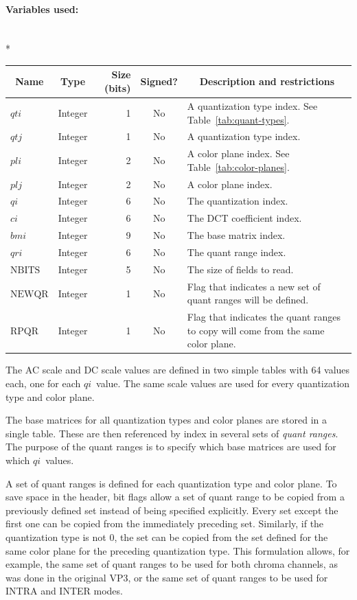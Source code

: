\documentclass[11pt,letterpaper]{book}
\newcommand{\idx}[1]{{\ensuremath{\mathit{#1}}}}
\newcommand{\qti}{\idx{qti}}
\newcommand{\qtj}{\idx{qtj}}
\newcommand{\pli}{\idx{pli}}
\newcommand{\plj}{\idx{plj}}
\newcommand{\qi}{\idx{qi}}
\newcommand{\ci}{\idx{ci}}
\newcommand{\bmi}{\idx{bmi}}
\newcommand{\qri}{\idx{qri}}
\newcommand{\locvar}[1]{\ensuremath{\mathrm{#1}}}
\newcommand{\term}[1]{{\em #1}}
\numberwithin{equation}{chapter}
\numberwithin{figure}{chapter}
\numberwithin{table}{chapter}
\begin{document}
\paragraph{Variables used:}\hfill\\*
\begin{tabularx}{\textwidth}{@{}llrcX@{}}\toprule
\multicolumn{1}{c}{Name} &
\multicolumn{1}{c}{Type} &
\multicolumn{1}{p{30pt}}{\centering Size (bits)} &
\multicolumn{1}{c}{Signed?} &
\multicolumn{1}{c}{Description and restrictions} \\\midrule\endhead
\locvar{\qti}    & Integer &  1 & No & A quantization type index.
See Table~\ref{tab:quant-types}.\\
\locvar{\qtj}    & Integer &  1 & No & A quantization type index. \\
\locvar{\pli}    & Integer &  2 & No & A color plane index.
See Table~\ref{tab:color-planes}.\\
\locvar{\plj}    & Integer &  2 & No & A color plane index. \\
\locvar{\qi}     & Integer &  6 & No & The quantization index. \\
\locvar{\ci}     & Integer &  6 & No & The DCT coefficient index. \\
\locvar{\bmi}    & Integer &  9 & No & The base matrix index. \\
\locvar{\qri}    & Integer &  6 & No & The quant range index. \\
\locvar{NBITS}   & Integer &  5 & No & The size of fields to read. \\
\locvar{NEWQR}   & Integer &  1 & No & Flag that indicates a new set of quant
 ranges will be defined. \\
\locvar{RPQR}    & Integer &  1 & No & Flag that indicates the quant ranges to
 copy will come from the same color plane. \\
\bottomrule\end{tabularx}
\medskip

The AC scale and DC scale values are defined in two simple tables with 64
 values each, one for each \qi\ value.
The same scale values are used for every quantization type and color plane.

The base matrices for all quantization types and color planes are stored in a
 single table.
These are then referenced by index in several sets of \term{quant ranges}.
The purpose of the quant ranges is to specify which base matrices are used for
 which \qi\ values.

A set of quant ranges is defined for each quantization type and color plane.
To save space in the header, bit flags allow a set of quant range to be copied
 from a previously defined set instead of being specified explicitly.
Every set except the first one can be copied from the immediately preceding
 set.
Similarly, if the quantization type is not $0$, the set can be copied from the
 set defined for the same color plane for the preceding quantization type.
This formulation allows, for example, the same set of quant ranges to be used
 for both chroma channels, as was done in the original VP3, or the same set of
 quant ranges to be used for INTRA and INTER modes.
\end{document}
